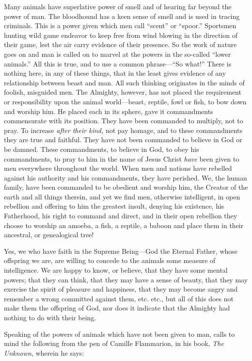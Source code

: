 Many animals have superlative power of smell and of hearing far beyond the power of man.
The bloodhound has a keen sense of smell and is used in tracing criminals. This is a power
given which men call ``scent'' or ``spoor.'' Sportsmen hunting wild game endeavor to keep free
from wind blowing in the direction of their game, lest the air carry evidence of their
presence. So the work of nature goes on and man is called on to marvel at the powers in the
so-called ``lower animals.'' All this is true, and to use a common phrase—``So what!'' There is
nothing here, in any of these things, that in the least gives evidence of any relationship
between beast and man. All such thinking originates in the minds of foolish, misguided men.
The Almighty, however, has not placed the requirement or responsibility upon the animal
world—beast, reptile, fowl or fish, to bow down and worship him. He placed each in its
sphere, gave it commandments commensurate with its position. They have been commanded
to multiply, not to pray. To increase \textit{after their kind,} not pay homage, and to these
commandments they are true and faithful. They have not been commanded to believe in God
or be damned. These commandments, to believe in God, to obey his commandments, to pray
to him in the name of Jesus Christ \textit{have} been given to men everywhere throughout the world.
When men and nations have rebelled against his authority and his commandments, they have
perished. We, the human family, have been commanded to be obedient and worship him, the
Creator of the earth and all things therein, and yet we find men, otherwise intelligent, in open
rebellion and offering to him the greatest insult, denying his existence, his Fatherhood, his
right to command and direct, and in their open rebellion they choose to worship an amoeba, a
fish, a reptile, a baboon and place them in their ancestral, or genealogical tree!

Yes, we who have faith in the Supreme Being—God the Eternal Father, whose offspring we
are, are willing to concede to the animals some measure of intelligence. We are happy to
know, or believe, that they have some mental powers; that they can think, that they may have
a sense of beauty, that they may exercise the spirit of pleasure and happiness, that they may
become angry and remember a wrong committed against them, etc. etc., but all of this does
not make them the offspring of God, nor does it indicate that the Almighty had nothing to do
with their being.

Speaking of the powers of animals which have not been given to man, calls to mind the
following from the pen of Camille Flammarion, in his book, \textit{The Unknown}, wherein he says:

